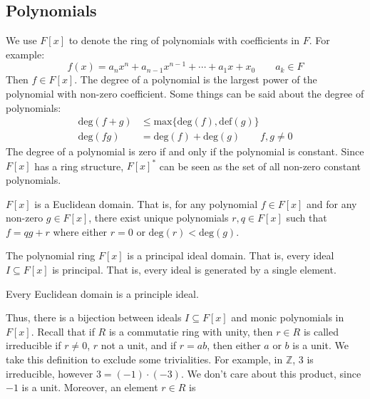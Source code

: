 \subsection{Polynomials}
    We use $F[x]$ to denote the ring of polynomials with coefficients in
    $F$. For example:
    \begin{equation}
        f(x)=a_{n}x^{n}+a_{n-1}x^{n-1}+\cdots+a_{1}x+x_{0}
        \quad\quad
        a_{k}\in{F}
    \end{equation}
    Then $f\in{F}[x]$. The degree of a polynomial is the largest power
    of the polynomial with non-zero coefficient. Some things can be said
    about the degree of polynomials:
    \begin{align}
        \textrm{deg}(f+g)&\leq
            \textrm{max}\{\textrm{deg}(f),\textrm{def}(g)\}\\
        \textrm{deg}(fg)&=\textrm{deg}(f)+\textrm{deg}(g)
        \quad\quad
        f,g\ne{0}
    \end{align}
    The degree of a polynomial is zero if and only if the polynomial is
    constant. Since $F[x]$ has a ring structure, $F[x]^{*}$ can be seen
    as the set of all non-zero constant polynomials.
    \begin{theorem}
        $F[x]$ is a Euclidean domain. That is, for any polynomial
        $f\in{F}[x]$ and for any non-zero $g\in{F}[x]$, there exist
        unique polynomials $r,q\in{F}[x]$ such that $f=qg+r$ where
        either $r=0$ or $\textrm{deg}(r)<\textrm{deg}(g)$.
    \end{theorem}
    \begin{theorem}
        The polynomial ring $F[x]$ is a principal ideal domain. That is,
        every ideal $I\subseteq{F}[x]$ is principal. That is, every
        ideal is generated by a single element.
    \end{theorem}
    \begin{theorem}
        Every Euclidean domain is a principle ideal.
    \end{theorem}
    Thus, there is a bijection between ideals $I\subseteq{F}[x]$ and
    monic polynomials in $F[x]$. Recall that if $R$ is a commutatie ring
    with unity, then $r\in{R}$ is called irreducible if $r\ne{0}$, $r$
    not a unit, and if $r=ab$, then either $a$ or $b$ is a unit. We take
    this definition to exclude some trivialities. For example, in
    $\mathbb{Z}$, 3 is irreducible, however
    $3=(\minus{1})\cdot(\minus{3})$. We don't care about this product,
    since $\minus{1}$ is a unit. Moreover, an element $r\in{R}$ is
